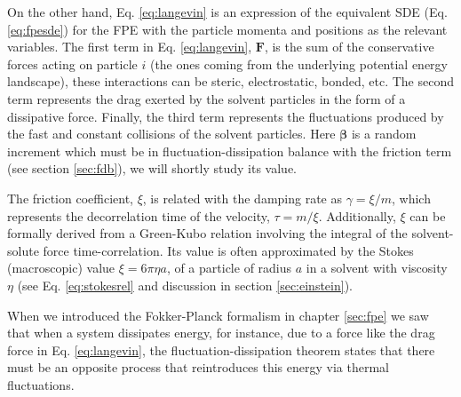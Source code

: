 \documentclass[twoside,openright,titlepage,numbers=noenddot,%
headinclude,footinclude,cleardoublepage=empty,abstract=on,
BCOR=5mm,fontsize=11pt, dvipsnames, paper=b5
]{scrreprt}
\renewcommand{\vec}[1]{\bm{#1}}
\begin{document}
On the other hand, Eq. \eqref{eq:langevin} is an expression of the equivalent \gls{SDE} (Eq. \eqref{eq:fpesde}) for the \gls{FPE} with the particle momenta and positions as the relevant variables. The first term in Eq. \eqref{eq:langevin}, $\vec{F}$, is the sum of the conservative forces acting on particle $i$ (the ones coming from the underlying potential energy landscape), these interactions can be steric, electrostatic, bonded, etc.
The second term represents the drag exerted by the solvent particles in the form of a dissipative force.
Finally, the third term represents the fluctuations produced by the fast and constant collisions of the solvent particles. Here $\vec{\beta}$ is a random increment which must be in fluctuation-dissipation balance with the friction term (see section \ref{sec:fdb}), we will shortly study its value.


The friction coefficient, $\xi$, is related with the damping rate as $\gamma = \xi/m$, which represents the decorrelation time of the velocity, $\tau = m/\xi$. Additionally, $\xi$ can be formally derived from a Green-Kubo relation involving the integral of the solvent-solute force time-correlation\cite{Green1954,Kubo1957}. Its value is often approximated by the Stokes (macroscopic) value $\xi=6\pi\eta a$, of a particle of radius $a$ in a solvent with viscosity $\eta$ (see Eq. \eqref{eq:stokesrel} and discussion in section \ref{sec:einstein}).

When we introduced the Fokker-Planck formalism in chapter \ref{sec:fpe} we saw that when a system dissipates energy, for instance, due to a force like the drag force in Eq. \eqref{eq:langevin}, the fluctuation-dissipation theorem states that there must be an opposite process that reintroduces this energy via thermal fluctuations.
\end{document}
